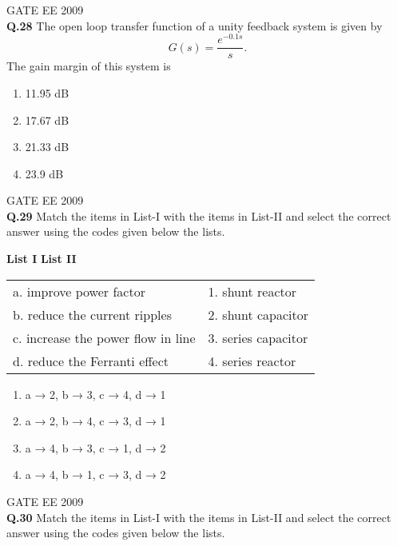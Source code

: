 \documentclass[12pt]{article}
\begin{document}
\vspace{0.5cm}
\hspace{10pt}
GATE EE 2009\\
\noindent\textbf{Q.28} The open loop transfer function of a unity feedback system is given by
\[
G(s) = \frac{e^{-0.1s}}{s}.
\]
The gain margin of this system is

\begin{enumerate}
    \item 11.95 dB
    \item 17.67 dB
    \item 21.33 dB
    \item 23.9 dB
\end{enumerate}

\vspace{1cm}

\hspace{10pt}
GATE EE 2009\\
\noindent\textbf{Q.29} Match the items in List-I with the items in List-II and select the correct answer using the codes given below the lists.

\vspace{0.3cm}

\noindent\textbf{List I} \hfill \textbf{List II}

\begin{tabular}{ll}
a. improve power factor & 1. shunt reactor \\
b. reduce the current ripples & 2. shunt capacitor \\
c. increase the power flow in line & 3. series capacitor \\
d. reduce the Ferranti effect & 4. series reactor \\
\end{tabular}

\vspace{0.3cm}

\begin{enumerate}
    \item a → 2, b → 3, c → 4, d → 1
    \item a → 2, b → 4, c → 3, d → 1
    \item a → 4, b → 3, c → 1, d → 2
    \item a → 4, b → 1, c → 3, d → 2
\end{enumerate}

\vspace{0.5cm}
\hspace{10pt}
GATE EE 2009\\
\noindent\textbf{Q.30} Match the items in List-I with the items in List-II and select the correct answer using the codes given below the lists.
\end{document}
